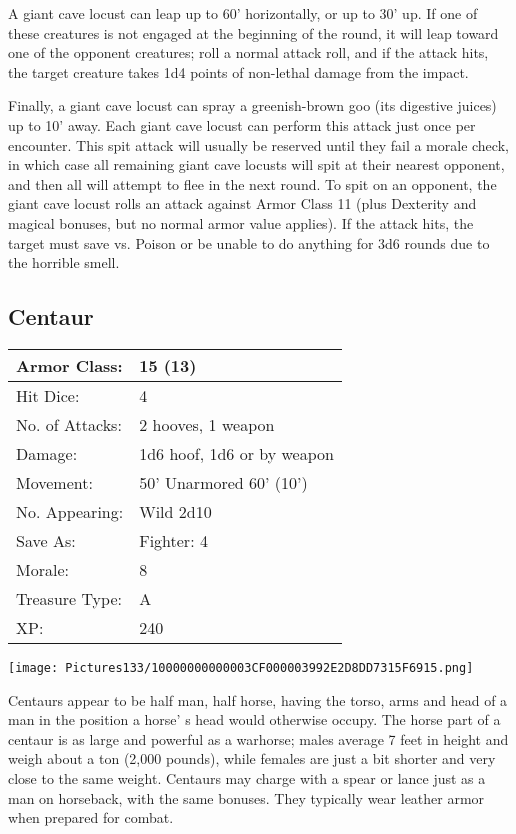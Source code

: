 \documentclass[a4paper,twoside,openany,10pt]{book}
\begin{document}
\begin{multicols}{2}
A giant cave locust can leap up to 60' horizontally, or up to 30' up. If one of these creatures is not engaged at the beginning of the round, it will leap toward one of the opponent creatures; roll a normal attack roll, and if the attack hits, the target creature takes 1d4 points of non-lethal damage from the impact.

Finally, a giant cave locust can spray a greenish-brown goo (its digestive juices) up to 10' away. Each giant cave locust can perform this attack just once per encounter. This spit attack will usually be reserved until they fail a morale check, in which case all remaining giant cave locusts will spit at their nearest opponent, and then all will attempt to flee in the next round. To spit on an opponent, the giant cave locust rolls an attack against Armor Class 11 (plus Dexterity and magical bonuses, but no normal armor value applies). If the attack hits, the target must save vs. Poison or be unable to do anything for 3d6 rounds due to the horrible smell.

\subsection*{Centaur}\label{centaur}

\begin{tabularx}{0.48\textwidth}{@{}lX@{}}
Armor Class: & 15 (13) \\\hline
Hit Dice: & 4 \\\hline
No. of Attacks: & 2 hooves, 1 weapon \\\hline
Damage: & 1d6 hoof, 1d6 or by weapon \\\hline
Movement: & 50' Unarmored 60'
(10') \\\hline
No. Appearing: & Wild 2d10 \\\hline
Save As: & Fighter: 4 \\\hline
Morale: & 8 \\\hline
Treasure Type: & A \\\hline
XP: & 240 \\\hline
\end{tabularx}\medskip


\begin{center}
	\texttt{[image: Pictures133/10000000000003CF000003992E2D8DD7315F6915.png]}
\end{center}\medskip

Centaurs appear to be half man, half horse, having the torso, arms and head of a man in the position a horse' s head would otherwise occupy. The horse part of a centaur is as large and powerful as a warhorse; males average 7 feet in height and weigh about a ton (2,000 pounds), while females are just a bit shorter and very close to the same weight. Centaurs may charge with a spear or lance just as a man on horseback, with the same bonuses. They typically wear leather armor when prepared for combat.


\end{multicols}
\end{document}
